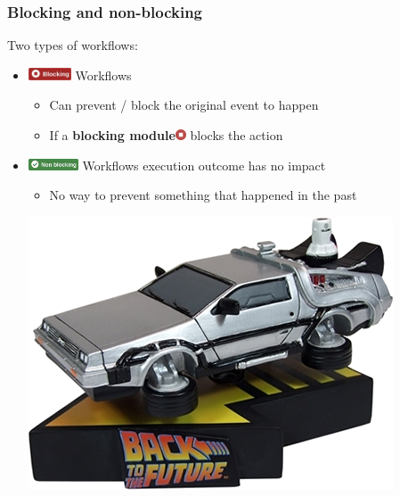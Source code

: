 \begin{frame}
    \frametitle{Blocking and non-blocking}
    Two types of workflows:
    \vspace{0.5em}
    \begin{itemize}
        \item[] \hspace*{-2em}\includegraphics[valign=m,width=48px]{pictures/blocking-workflow.png} Workflows
        \begin{itemize}
            \item Can prevent / block the original event to happen
            \item If a \textbf{blocking module}\includegraphics[valign=b,width=12px]{pictures/blocking-module.png} blocks the action
        \end{itemize}
        \vspace{0.5em}
        \item[] \hspace*{-2em}\includegraphics[valign=b,width=56px]{pictures/non-blocking-workflow.png} Workflows execution outcome has no impact
        \begin{itemize}
            \item No way to prevent something that happened in the past
        \end{itemize}
        \begin{center}
            \includegraphics[width=0.4\linewidth]{pictures/time-machine.png}
        \end{center}
    \end{itemize}
\end{frame}

